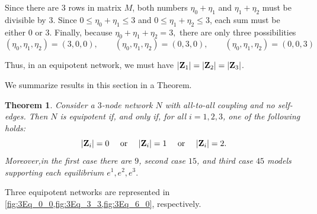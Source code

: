 \documentclass[12pt]{amsart}
\newcommand{\bZ}{{\bf Z}}
\newtheorem{thm}{Theorem}[section]
\theoremstyle{definition}
\begin{document}
Since there are $3$ rows in matrix $M$, both numbers $\eta_0+\eta_1$ and $\eta_1+\eta_2$ must be divisible by $3$. Since $0\le \eta_0+\eta_1\le 3$ and $0\le \eta_1+\eta_2\le 3$,
each sum must be either 0 or 3. Finally, because $\eta_0+\eta_1+\eta_2=3,$ there are only three possibilities
\[(\eta_0,\eta_1,\eta_2)=(3,0,0),\qquad (\eta_0,\eta_1,\eta_2)=(0,3,0), \qquad (\eta_0,\eta_1,\eta_2)=(0,0,3)\]

Thus, in an equipotent network, we must have 
$|\bZ_1|=|\bZ_2|=|\bZ_3|$. 

We summarize results in this section in a Theorem.

\begin{thm}\label{cor:3node}
Consider a $3$-node network $N$ with all-to-all coupling and no self-edges. Then $N$ is equipotent if, and only if, 
for all $i=1,2,3$, one of the following holds:
\[ |\bZ_i|=0 \quad \mbox{ or } \quad |\bZ_i|=1 \quad \mbox{ or } \quad |\bZ_i| =2. \] 
Moreover,in the first case there are $9$, second case $ 15$, and third case $ 45$ models supporting each equilibrium $e^1,e^2, e^3.$
\end{thm}

Three equipotent networks are represented in \cref{fig:3Eq_0_0,fig:3Eq_3_3,fig:3Eq_6_0}, respectively.
\end{document}
